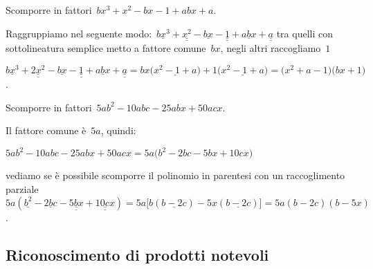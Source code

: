  \begin{esempio}
Scomporre in fattori~\(bx^{3}+x^{2}-bx-1+abx+a\).
 \begin{enumeratea}
  \item Raggruppiamo nel seguente 
   modo:~\(\underline{bx^{3}}+\underline{\underline {x^{2}}}-\underline{bx}-
          \underline{\underline{1}}+\underline{abx}+\underline{\underline{a}}\) 
   tra quelli con sottolineatura semplice metto a fattore comune~\(bx\), 
   negli altri raccogliamo~\(1\)
  \item
   \(\underline{bx^{3}}+\underline{\underline {2x^{2}}}-\underline{bx}-
    \underline{\underline{1}}+\underline{abx}+\underline{\underline{a}}=
    bx\bigl(\underline{x^{2}-1+a}\bigr)+1\bigl(\underline{x^{2}-1+a}\bigr)=
    \bigl(x^{2}+a-1\bigr)\bigl(bx+1\bigr)\).
 \end{enumeratea}
 \end{esempio}

 \begin{esempio}
Scomporre in fattori~\(5ab^{2}-10abc-25abx+50acx\).
 \begin{enumeratea}
  \item Il fattore comune è~\(5a\), quindi:
    \begin{itemize*}
    \item \(5ab^{2}-10abc-25abx+50acx=5a\bigl(b^{2}-2bc-5bx+10cx\bigr)\)
    \end{itemize*}
  \item vediamo se è possibile scomporre il polinomio in parentesi con un 
   raccoglimento parziale~\(5a(\underline{b^{2}}-\underline{2bc}
     -\underline{\underline{5bx}}+\underline{\underline{10cx}})=
     5a\bigl[b(\underline{b-2c})-5x(\underline{b-2c})\bigr]=5a(b-2c)(b-5x)\).
 \end{enumeratea}
 \end{esempio}

% 


\subsection{Riconoscimento di prodotti notevoli}
\label{subsec:divpol_prodnot}

